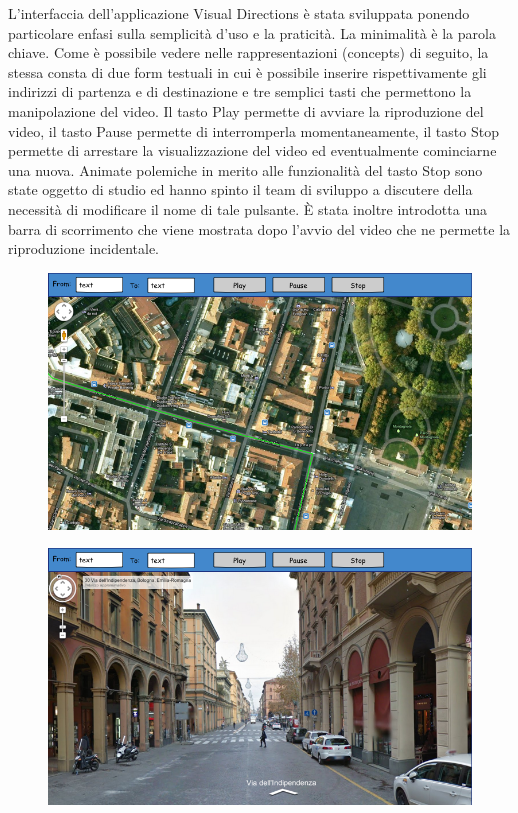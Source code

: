 \documentclass[12pt,a4paper,openright, notitlepage]{report}
\begin{document}
L’interfaccia dell’applicazione Visual Directions è stata sviluppata ponendo particolare enfasi sulla semplicità d’uso e la praticità. La minimalità è la parola chiave. Come è possibile vedere nelle rappresentazioni (concepts) di seguito, la stessa consta di due form testuali in cui è possibile inserire rispettivamente gli indirizzi di partenza e di destinazione e tre semplici tasti che permettono la manipolazione del video. Il tasto Play permette di avviare la riproduzione del video, il tasto Pause permette di interromperla momentaneamente, il tasto Stop permette di arrestare la visualizzazione del video ed eventualmente cominciarne una nuova. Animate polemiche in merito alle funzionalità del tasto Stop sono state oggetto di studio ed hanno spinto il team di sviluppo a discutere della necessità di modificare il nome di tale pulsante. È stata inoltre introdotta una barra di scorrimento che viene mostrata dopo l’avvio del video che ne permette la riproduzione incidentale.

\begin{figure}[H]
\centering
{\includegraphics[width=\textwidth]{imgs/prototipe-interface1}}
\end{figure}

\begin{figure}[H]
\centering
{\includegraphics[width=\textwidth]{imgs/prototipe-interface2}}
\end{figure}
\end{document}
